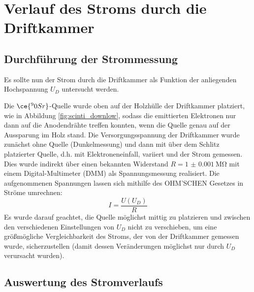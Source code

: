 \chapter{Verlauf des Stroms durch die Driftkammer}\label{sec:strom}

\section{Durchführung der Strommessung}

Es sollte nun der Strom durch die Driftkammer als Funktion der anliegenden Hochspannung $U_D$ untersucht werden.

%

Die $\ce{^90Sr}$-Quelle wurde oben auf der Holzhülle der Driftkammer platziert, wie in Abbildung \ref{fig:scinti_downlow}, sodass die emittierten Elektronen nur dann auf die Anodendrähte treffen konnten, wenn die Quelle genau auf der Aussparung im Holz stand. Die Versorgungsspannung der Driftkammer wurde zunächst ohne Quelle (Dunkelmessung) und dann mit über dem Schlitz platzierter Quelle, d.h. mit Elektroneneinfall, variiert und der Strom gemessen. Dies wurde indirekt über einen bekannten Widerstand $R=\SI{1(0.001)}{\mega\ohm}$ mit einem Digital-Multimeter (DMM) als Spannungsmessung realisiert. Die aufgenommenen Spannungen lassen sich mithilfe des \uppercase{Ohm'schen} Gesetzes in Ströme umrechnen: \[I = \frac{U(U_D)}{R}\]
Es wurde darauf geachtet, die Quelle möglichst mittig zu platzieren und zwischen den verschiedenen Einstellungen von $U_D$ nicht zu verschieben, um eine größmögliche Vergleichbarkeit des Stroms, der von der Driftkammer gemessen wurde, sicherzustellen (damit dessen Veränderungen möglichst nur durch $U_D$ verursacht wurden).

\section{Auswertung des Stromverlaufs}


